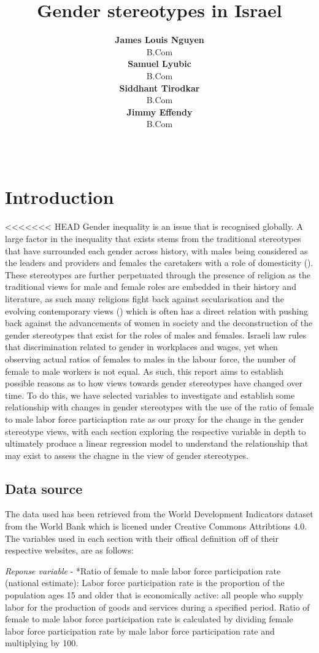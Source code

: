 \documentclass[11pt,a4paper,]{article}
\title{Gender stereotypes in Israel}
\author{\sf\Large\textbf{ James Louis Nguyen}\\ {\sf\large B.Com\\[0.5cm]} \sf\Large\textbf{ Samuel Lyubic}\\ {\sf\large B.Com\\[0.5cm]} \sf\Large\textbf{ Siddhant Tirodkar}\\ {\sf\large B.Com\\[0.5cm]} \sf\Large\textbf{ Jimmy Effendy}\\ {\sf\large B.Com\\[0.5cm]}}
\date{\sf\Date~\Month~\Year}
\makeatletter
\def\titlepage{\front{\expandafter{\@title}}{\@author}{\@organization}}
\makeatother
\begin{document}
\titlepage

\section*{Introduction}

<<<<<<< HEAD
Gender inequality is an issue that is recognised globally. A large
factor in the inequality that exists stems from the traditional
stereotypes that have surrounded each gender across history, with males
being considered as the leaders and providers and females the caretakers
with a role of domesticity (\textcite{Woodhead}). These stereotypes are
further perpetuated through the presence of religion as the traditional
views for male and female roles are embedded in their history and
literature, as such many religions fight back against secularisation and
the evolving contemporary views (\textcite{VoicuM2009}) which is often
has a direct relation with pushing back against the advancements of
women in society and the deconstruction of the gender stereotypes that
exist for the roles of males and females. Israeli law rules that
discrimination related to gender in workplaces and wages, yet when
observing actual ratios of females to males in the labour force, the
number of female to male workers is not equal. As such, this report aims
to establish possible reasons as to how views towards gender stereotypes
have changed over time. To do this, we have selected variables to
investigate and establish some relationship with changes in gender
stereotypes with the use of the ratio of female to male labor force
particiaption rate as our proxy for the change in the gender stereotype
views, with each section exploring the respective variable in depth to
ultimately produce a linear regression model to understand the
relationship that may exist to assess the chagne in the view of gender
stereotypes.

\subsection{Data source}\label{data-source}

The data used has been retrieved from the World Development Indicators
dataset from the World Bank \textcite{TheWorldBank2020} which is licened
under Creative Commons Attribtions 4.0. The variables used in each
section with their offical definition off of their respective websites,
are as follows:

\emph{Reponse variable} - *Ratio of female to male labor force
participation rate (national estimate): Labor force participation rate
is the proportion of the population ages 15 and older that is
economically active: all people who supply labor for the production of
goods and services during a specified period. Ratio of female to male
labor force participation rate is calculated by dividing female labor
force participation rate by male labor force participation rate and
multiplying by 100.
\end{document}
